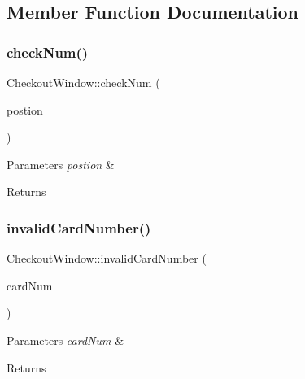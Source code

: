 \subsection{Member Function Documentation}
\mbox{\label{class_checkout_window_ad3d3908e0916fbb5abdc134d7d1bcb03}} 
\subsubsection{\texorpdfstring{check\+Num()}{checkNum()}}
{\footnotesize\ttfamily Checkout\+Window\+::check\+Num (\begin{DoxyParamCaption}\item[{Q\+Char}]{postion }\end{DoxyParamCaption})}


\begin{DoxyParams}{Parameters}
{\em postion} & \\
\hline
\end{DoxyParams}
\begin{DoxyReturn}{Returns}

\end{DoxyReturn}
\mbox{\label{class_checkout_window_a28612fc41a4491136ae4327363cbeb74}} 
\subsubsection{\texorpdfstring{invalid\+Card\+Number()}{invalidCardNumber()}}
{\footnotesize\ttfamily Checkout\+Window\+::invalid\+Card\+Number (\begin{DoxyParamCaption}\item[{Q\+String}]{card\+Num }\end{DoxyParamCaption})}


\begin{DoxyParams}{Parameters}
{\em card\+Num} & \\
\hline
\end{DoxyParams}
\begin{DoxyReturn}{Returns}

\end{DoxyReturn}
\mbox{\label{class_checkout_window_a5fab2958fac97a8a986065cb4ccf8d03}} 
